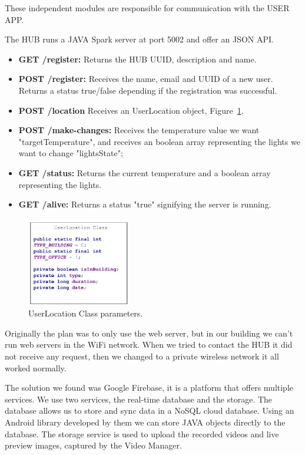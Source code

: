 These independent modules are responsible for communication with the USER APP.

The HUB runs a JAVA Spark server at port 5002 and offer an \ac{JSON} API.

\begin{itemize}
  \item \textbf{GET /register:} Returns the HUB UUID, description and name.
  \item \textbf{POST /register:} Receives the name, email and UUID of a new user. Returns a status true/false depending if the registration was successful.
  \item \textbf{POST /location} Receives an UserLocation object, Figure~\ref{user_location_class}.
  \item \textbf{POST /make-changes:} Receives the temperature value we want "targetTemperature", and receives an boolean array representing the lights we want to change "lightsState";
   \item \textbf{GET /status:} Returns the current temperature and a boolean array representing the lights.
   \item \textbf{GET /alive:} Returns a status "true" signifying the server is running.
\end{itemize}






\begin{figure}[h]
\centering
\includegraphics[width=0.4\textwidth]{Figures/userlocation_class}
\caption{UserLocation Class parameters.}
\label{user_location_class}
\end{figure}



Originally the plan was to only use the web server, but in our building we can't run web servers in the WiFi network. When we tried to contact the HUB it did not receive any request, then we changed to a private wireless network it all worked normally.

The solution we found was Google Firebase, it is a platform that offers multiple services. We use two services, the real-time database and the storage.
The database allows us to store and sync data in a NoSQL cloud database. Using an Android library developed by them we can store JAVA objects directly to the database. The storage service is used to upload the recorded videos and live preview images, captured by the Video Manager.

